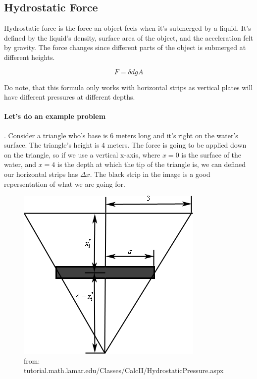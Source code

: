 \subsection{Hydrostatic Force}

Hydrostatic force is the force an object feels when it's submerged by a liquid. It's defined 
by the liquid's density, surface area of the object, and the acceleration felt by gravity. The force changes since different parts of the object is submerged at different heights. 

\begin{equation}
	F = \delta dgA
\end{equation}

Do note, that this formula only works with horizontal strips as vertical plates will have different pressures at different depths.  

\paragraph*{Let's do an example problem}. Consider a triangle who's base is 6 meters long and it's right on the water's surface. The triangle's height is 4 meters. The force is going to be applied down on the triangle, so if we use a vertical x-axis, where $x=0$ is the surface of the water, and $x=4$ is the depth at which the tip of the triangle is, we can defined our horizontal strips has $\Delta x$. The black strip in the image is a good repersentation of what we are going for.

\begin{figure}[H]
	\begin{center}
		\includegraphics[scale=0.45]{pages/images/hystatic}
		\caption{from: tutorial.math.lamar.edu/Classes/CalcII/HydrostaticPressure.aspx}	
		\label{fig:test_figure}
	\end{center}
\end{figure}

